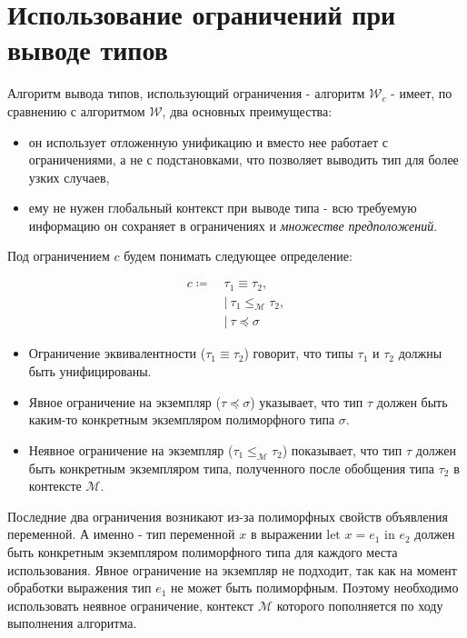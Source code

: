 \section{Использование ограничений при выводе типов}
\label{sec:constratints_usage}

Алгоритм вывода типов, использующий ограничения - алгоритм $\mathcal{W}_c$ - имеет, по сравнению с алгоритмом $\mathcal{W}$, два основных преимущества:
\begin{itemize}
    \item он использует отложенную унификацию и вместо нее работает с ограничениями, а не с подстановками, что позволяет выводить тип для более узких случаев,
    \item ему не нужен глобальный контекст при выводе типа - всю требуемую информацию он сохраняет в ограничениях и \textit{множестве предположений}.
\end{itemize}

Под ограничением $c$ будем понимать следующее определение:

\begin{equation}
    \label{eq:cst}
    \begin{aligned}
        c \coloneqq ~ &\tau_1 \equiv \tau_2, \\
        &| ~ \tau_1 \leq_{\mathcal{M}} \tau_2, \\
        &| ~ \tau \preceq \sigma
    \end{aligned}
\end{equation}

\begin{itemize}
    \item Ограничение эквивалентности ($\tau_1 \equiv \tau_2$) говорит, что типы $\tau_1$ и $\tau_2$ должны быть унифицированы.
    \item Явное ограничение на экземпляр ($\tau \preceq \sigma$) указывает, что тип $\tau$ должен быть каким-то конкретным экземпляром полиморфного типа $\sigma$.
    \item Неявное ограничение на экземпляр ($\tau_1 \leq_{\mathcal{M}} \tau_2$) показывает, что тип $\tau$ должен быть конкретным экземпляром типа, полученного после обобщения типа $\tau_2$ в контексте $\mathcal{M}$.
\end{itemize}

Последние два ограничения возникают из-за полиморфных свойств объявления переменной.
А именно - тип переменной $x$ в выражении $\text{let } x = e_1 \text{ in } e_2$ должен быть конкретным экземпляром полиморфного типа для каждого места использования.
Явное ограничение на экземпляр не подходит, так как на момент обработки выражения тип $e_1$ не может быть полиморфным.
Поэтому необходимо использовать неявное ограничение, контекст $\mathcal{M}$ которого пополняется по ходу выполнения алгоритма.

